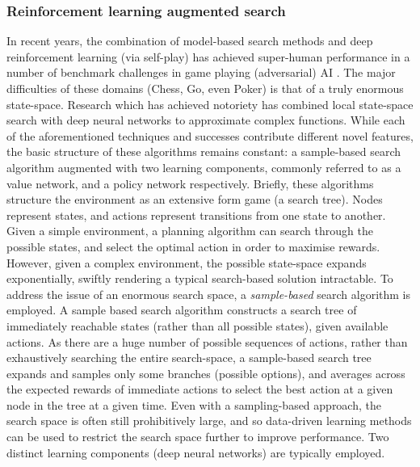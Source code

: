 \subsubsection{Reinforcement learning augmented search} \label{RL + Search}
In recent years, the combination of model-based search methods and deep reinforcement learning (via self-play) has achieved super-human performance in a number of benchmark challenges in game playing (adversarial) AI \cite{AlphaGo,Brown2020,Lerer2019}. 
The major difficulties of these domains (Chess, Go, even Poker) is that of a truly enormous state-space. Research which has achieved notoriety has combined local state-space search with deep neural networks to approximate complex functions. 
\newline \newline
While each of the aforementioned techniques and successes contribute different novel features, the basic structure of these algorithms remains constant: a sample-based search algorithm augmented with two learning components, commonly referred to as a value network, and a policy network respectively.
\newline \newline
Briefly, these algorithms structure the environment as an extensive form game (a search tree). Nodes represent states, and actions represent transitions from one state to another. Given a simple environment, a planning algorithm can search through the possible states, and select the optimal action in order to maximise rewards. However, given a complex environment, the possible state-space expands exponentially, swiftly rendering a typical search-based solution intractable. To address the issue of an enormous search space, a \textit{sample-based} search algorithm is employed. 
\newline \newline
A sample based search algorithm constructs a search tree of immediately reachable states (rather than all possible states), given available actions. As there are a huge number of possible sequences of actions, rather than exhaustively searching the entire search-space, a sample-based search tree expands and samples only some branches (possible options), and averages across the expected rewards of immediate actions to select the best action at a given node in the tree at a given time.
\newline \newline
Even with a sampling-based approach, the search space is often still prohibitively large, and so data-driven learning methods can be used to restrict the search space further to improve performance. Two distinct learning components (deep neural networks) are typically employed.  
